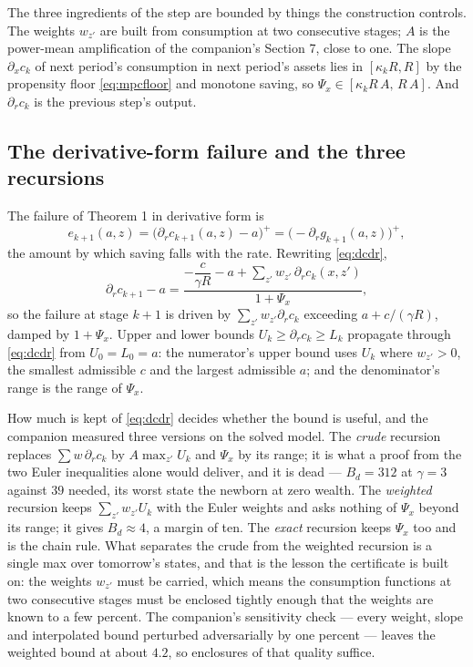 \documentclass[11pt]{article}
\theoremstyle{definition}
\theoremstyle{remark}
\begin{document}
The three ingredients of the step are bounded by things the construction controls. The weights
$w_{z'}$ are built from consumption at two consecutive stages; $A$ is the power-mean amplification
of the companion's Section 7, close to one. The slope $\partial_xc_k$ of next period's consumption in
next period's assets lies in $[\kappa_kR,R]$ by the propensity floor \eqref{eq:mpcfloor} and
monotone saving, so $\Psi_x\in[\kappa_kR\,A,\,R\,A]$. And $\partial_rc_k$ is the previous step's
output.

\subsection{The derivative-form failure and the three recursions}

The failure of Theorem 1 in derivative form is
\[
  e_{k+1}(a,z)=\bigl(\partial_rc_{k+1}(a,z)-a\bigr)^+=\bigl(-\partial_rg_{k+1}(a,z)\bigr)^+ ,
\]
the amount by which saving falls with the rate. Rewriting \eqref{eq:dcdr},
\[
  \partial_rc_{k+1}-a
  =\frac{-\dfrac{c}{\gamma R}-a+\sum_{z'}w_{z'}\,\partial_rc_k(x,z')}{1+\Psi_x},
\]
so the failure at stage $k+1$ is driven by $\sum_{z'}w_{z'}\partial_rc_k$ exceeding
$a+c/(\gamma R)$, damped by $1+\Psi_x$. Upper and lower bounds $U_k\ge\partial_rc_k\ge L_k$ propagate
through \eqref{eq:dcdr} from $U_0=L_0=a$: the numerator's upper bound uses $U_k$ where
$w_{z'}>0$, the smallest admissible $c$ and the largest admissible $a$; and the denominator's
range is the range of $\Psi_x$.

How much is kept of \eqref{eq:dcdr} decides whether the bound is useful, and the companion measured
three versions on the solved model. The \emph{crude} recursion replaces $\sum w\,\partial_rc_k$ by
$A\max_{z'}U_k$ and $\Psi_x$ by its range; it is what a proof from the two Euler inequalities alone
would deliver, and it is dead --- $B_d=312$ at $\gamma=3$ against $39$ needed, its worst state the
newborn at zero wealth. The \emph{weighted} recursion keeps $\sum_{z'}w_{z'}U_k$ with the Euler
weights and asks nothing of $\Psi_x$ beyond its range; it gives $B_d\approx4$, a margin of ten. The
\emph{exact} recursion keeps $\Psi_x$ too and is the chain rule. What separates the crude from the
weighted recursion is a single max over tomorrow's states, and that is the lesson the certificate is
built on: the weights $w_{z'}$ must be carried, which means the consumption functions at two
consecutive stages must be enclosed tightly enough that the weights are known to a few percent. The
companion's sensitivity check --- every weight, slope and interpolated bound perturbed adversarially
by one percent --- leaves the weighted bound at about $4.2$, so enclosures of that quality suffice.
\end{document}
